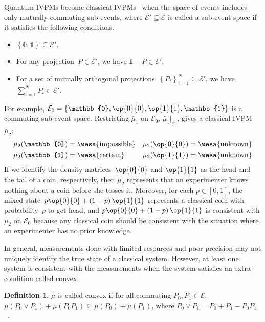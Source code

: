\documentclass[english,reprint, aps, prl,superscriptaddress, showpacs,
showkeys, longbibliography, amsmath, amssymb]{revtex4-1}
\theoremstyle{plain}
\theoremstyle{definition}
\newtheorem{definition}[thm]{Definition}
\newcommand{\events}{\ensuremath{\mathcal{E}}}
\newcommand{\imposs}{{\text{\wesa{impossible}}}}
\newcommand{\necess}{{\text{\wesa{certain}}}}
\newcommand{\unknown}{{\text{\wesa{unknown}}}}
\newcommand{\proj}[1]{\op{#1}{#1}}
\begin{document}
Quantum IVPMs become classical IVPMs~\cite{JamisonLodwick2004} when
the space of events includes only mutually commuting sub-events, where
$\events'\subseteq\events$ is called a sub-event space if it satisfies
the following conditions.
\begin{itemize}
\item $\left\{ \mathbb{0},\mathbb{1}\right\} \subseteq\events'$.
\item For any projection~$P\in\events'$, we have $\mathbb{1}-P\in\events'$. 
\item For a set of mutually orthogonal projections~$\left\{ P_{i}\right\} _{i=1}^{N}\subseteq\events'$,
we have $\sum_{i=1}^{N}P_{i}\in\events'$. 
\end{itemize}
For example, $\events_{0}=\left\{ \mathbb{0},\proj{0},\proj{1},\mathbb{1}\right\} $
is a commuting sub-event space. Restricting $\bar{\mu}_{1}$ on $\events_{0}$,
$\bar{\mu}_{1}|_{\events_{0}}$, gives a classical IVPM~$\bar{\mu}_{2}$:
\begin{equation}
\begin{aligned}\bar{\mu}_{2}(\mathbb{0}) & =\imposs & \bar{\mu}_{2}(\proj{0}) & =\unknown\\
\bar{\mu}_{2}(\mathbb{1}) & =\necess & \bar{\mu}_{2}(\proj{1}) & =\unknown
\end{aligned}
\end{equation}
If we identify the density matrices~$\proj{0}$ and $\proj{1}$ as
the head and the tail of a coin, respectively, then $\bar{\mu}_{2}$
represents that an experimenter knows nothing about a coin before
she tosses it. Moreover, for each $p\in\left[0,1\right]$, the mixed
state~$p\proj{0}+\left(1-p\right)\proj{1}$ represents a classical
coin with probability~$p$ to get head, and $p\proj{0}+\left(1-p\right)\proj{1}$
is consistent with $\bar{\mu}_{2}$ on $\events_{0}$ because any
classical coin should be consistent with the situation where an experimenter
has no prior knowledge.

In general, measurements done with limited resources and poor precision
may not uniquely identify the true state of a classical system. However,
at least one system is consistent with the measurements when the system
satisfies an extra-condition called convex.

\begin{definition}
$\bar{\mu}$ is called convex if for all commuting $P_{0},P_{1}\in\events$,
$\bar{\mu}\left(P_{0}\vee P_{1}\right)+\bar{\mu}\left(P_{0}P_{1}\right)\subseteq\bar{\mu}\left(P_{0}\right)+\bar{\mu}\left(P_{1}\right)$,
where $P_{0}\vee P_{1}=P_{0}+P_{1}-P_{0}P_{1}$~\cite{Griffiths2003}.
\end{definition}
\end{document}
